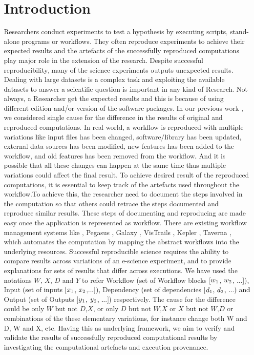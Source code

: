 \documentclass[10pt,conference,twocolumn]{IEEEtran}
\begin{document}
\section{Introduction}
Researchers conduct experiments to test a hypothesis by executing scripts, stand-alone programs or workflows. They often reproduce experiments to achieve their expected results and the artefacts of the successfully reproduced computations play major role in the extension of the research. Despite successful reproducibility, many of the science experiments outputs unexpected results. Dealing with large datasets is a complex task and exploiting the available datasets to answer a scientific question is important in any kind of Research. Not always, a Researcher get the expected results and this is because of using different edition and/or version of the software packages. In our previous work \cite{thavasimani2016}, we considered single cause for the difference in the results of original and reproduced computations.  In real world, a workflow is reproduced with multiple variations like input files has been changed, software/library has been updated, external data sources has been modified, new features has been added to the workflow, and old features has been removed from the workflow.  And it is possible that all these changes can happen at the same time thus multiple variations could affect the final result. To achieve desired result of the reproduced computations, it is essential to keep track of the artefacts used throughout the workflow.To achieve this, the researcher need to document the steps involved in the computation so that others could retrace the steps documented and reproduce similar results. These steps of documenting and reproducing are made easy once the application is represented as workflow. There are existing workflow management systems like \cite{Hiden2012}, Pegasus \cite{kim2008}, Galaxy \cite{Galaxy}, VisTrails \cite{VisTrails}, Kepler \cite{Kepler}, Taverna \cite{Taverna}, which automates the computation by mapping the abstract workflows into the underlying resources.   Successful reproducible science requires the ability to compare results across variations of an e-science experiment, and to provide explanations for sets of results that differ across executions. We have used the notations $W$, $X$, $D$ and $Y$ to refer Workflow (set of Workflow blocks [$w\textsubscript{1}$, $w\textsubscript{2}$, ...]), Input (set of inputs [$x\textsubscript{1}$, $x\textsubscript{2}$,...]), Dependency  (set of dependencies [$d\textsubscript{1}$, $d\textsubscript{2}$, ...) and Output (set of Outputs [$y\textsubscript{1}$, $y\textsubscript{2}$, ...]) respectively. The cause for the difference could be only $W$ but not $D$,$X$, or only $D$ but not $W$,$X$ or $X$ but not $W$,$D$ or combinations of the these elementary variations, for instance change both W and D, W and X, etc. Having this as underlying framework, we aim to verify and validate the results of successfully reproduced computational results by investigating the computational artefacts and execution provenance.
\end{document}
